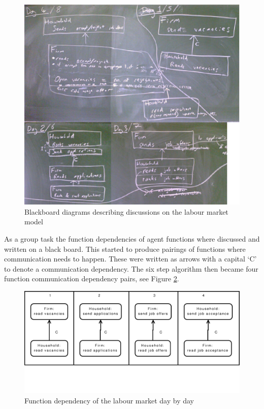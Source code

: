 \documentclass[a4paper,11pt]{article}
\begin{document}
\begin{figure}
\begin{center}
\includegraphics*[width = \linewidth]{labour_1_eps.eps}
\caption{Blackboard diagrams describing discussions on the labour market model} \label{fig:blackboard_lmm}
\end{center}
\end{figure}

As a group task the function dependencies of agent functions where
discussed and written on a black board. This started to produce
pairings of functions where communication needs to happen. These
were written as arrows with a capital `C' to denote a communication
dependency. The six step algorithm then became four function
communication dependency pairs, see Figure \ref{fig:bb}.

\begin{figure}
\begin{center}
\includegraphics*[width = \linewidth]{labour_maket_day_by_day.eps}
\caption{Function dependency of the labour market day by day} \label{fig:bb}
\end{center}
\end{figure}
\end{document}
